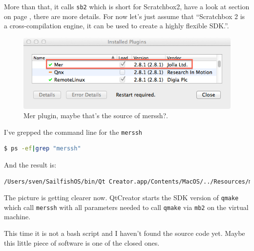 More than that, it calls \verb,sb2, which is short for Scratchbox2, have a look at section  on page \pageref{subsec:scratchbox2}, there are more details. For now let's just assume that ``Scratchbox 2 is a cross-compilation engine, it can be used to create a highly flexible SDK.''\cite{sb2}.
%
\begin{figure}[H]
  \centering
  \includegraphics[scale=0.5]{../media/gfx/QtCreator/merplugin.png} 
  \caption{Mer plugin, maybe that's the source of merssh?.}
  \label{fig:merplugin}
\end{figure}
%
I've grepped the command line for the \verb,merssh,
\begin{lstlisting}[language=bash]
$ ps -ef|grep "merssh"
\end{lstlisting}
%
And the result is:
\begin{lstlisting}[language=bash]
/Users/sven/SailfishOS/bin/Qt Creator.app/Contents/MacOS/../Resources/merssh -sdktoolsdir /Users/sven/.config/SailfishAlpha3/mer-sdk-tools/MerSDK -commandtype mb2 -mertarget SailfishOS-i486-x86 qmake /Users/sven/QtProjects/TestSailfishOS/TestSailfishOS.pro -r -spec linux-g++ CONFIG+=debug CONFIG+=declarative_debug CONFIG+=qml_debug -after OBJECTS_DIR=obj MOC_DIR=moc UI_DIR=ui RCC_DIR=rcc
\end{lstlisting}
%
The picture is getting clearer now. QtCreator starts the SDK version of \verb,qmake, which call \verb,merssh, with all parameters needed to call \verb,qmake, via \verb,mb2, on the virtual machine.

This time it is not a bash script and I haven't found the source code yet. Maybe this little piece of software is one of the closed ones.
%
%
